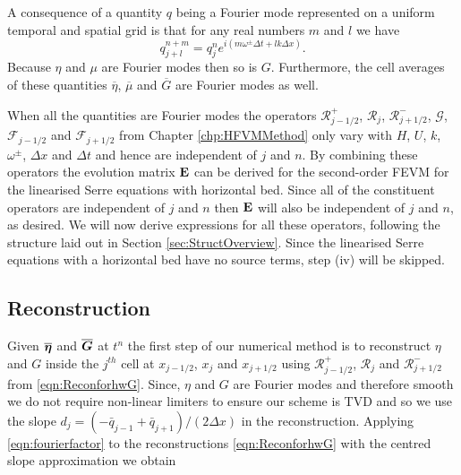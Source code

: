 A consequence of a quantity $q$ being a Fourier mode represented on a uniform temporal and spatial grid is that for any real numbers $m$ and $l$ we have
\begin{equation}
q^{n + m}_{j + l} = q^n_j e^{ i \left(m \omega^\pm \Delta t + l k \Delta x\right)}.
\label{eqn:fourierfactor}
\end{equation}
Because $\eta$ and $\mu$ are Fourier modes then so is $G$. Furthermore, the cell averages of these quantities $\overline{\eta}$, $\overline{\mu}$ and $\overline{G}$ are Fourier modes as well.

When all the quantities are Fourier modes the operators $\mathcal{R}^+_{j-1/2}$, $\mathcal{R}_{j}$, $\mathcal{R}^-_{j+1/2}$, $\mathcal{G}$, $\mathcal{F}_{j-1/2}$ and $\mathcal{F}_{j+1/2}$ from Chapter \ref{chp:HFVMMethod} only vary with $H$, $U$, $k$, $\omega^\pm$, $\Delta x$ and $\Delta t$ and hence are independent of $j$ and $n$. By combining these operators the evolution matrix $\mathbf{E}$ can be derived for the second-order FEVM for the linearised Serre equations with horizontal bed. Since all of the constituent operators are independent of $j$ and $n$ then $\mathbf{E}$ will also be independent of $j$ and $n$, as desired. We will now derive expressions for all these operators, following the structure laid out in Section \ref{sec:StructOverview}. Since the linearised Serre equations with a horizontal bed have no source terms, step (iv) will be skipped.   

\subsection{Reconstruction}
Given $\overline{\boldsymbol{\eta}}$ and $\overline{\boldsymbol{G}}$ at $t^n$ the first step of our numerical method is to reconstruct $\eta$ and $G$ inside the $j^{th}$ cell at $x_{j-1/2}$, $x_j$ and $x_{j+1/2}$ using $\mathcal{R}^+_{j-1/2}$, $\mathcal{R}_{j}$ and $\mathcal{R}^-_{j+1/2}$ from \eqref{eqn:ReconforhwG}. Since, $\eta$ and $G$ are Fourier modes and therefore smooth we do not require non-linear limiters to ensure our scheme is TVD and so we use the slope $d_j = \left({-\bar{q}_{j-1} +\bar{q}_{j+1}}\right)/ \left({2\Delta x} \right)$ in the reconstruction. Applying \eqref{eqn:fourierfactor} to the reconstructions \eqref{eqn:ReconforhwG} with the centred slope approximation we obtain 

